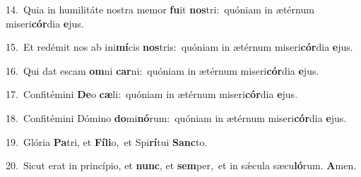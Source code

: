 {\numbfont\textcolor{\numbcolor}{14.}}~Quia in humilitáte nostra memor \textbf{fu}\-it \textbf{nos}\-tri:~\star quóniam in ætérnum miseri\-\textbf{cór}\-dia \textbf{e}\-jus.\par
{\numbfont\textcolor{\numbcolor}{15.}}~Et redémit nos ab ini\-\textbf{mí}\-cis \textbf{nos}\-tris:~\star quóniam in ætérnum miseri\-\textbf{cór}\-dia \textbf{e}\-jus.\par
{\numbfont\textcolor{\numbcolor}{16.}}~Qui dat escam \textbf{om}\-ni \textbf{car}\-ni:~\star quóniam in ætérnum miseri\-\textbf{cór}\-dia \textbf{e}\-jus.\par
{\numbfont\textcolor{\numbcolor}{17.}}~Confitémini \textbf{De}\-o \textbf{cæ}\-li:~\star quóniam in ætérnum miseri\-\textbf{cór}\-dia \textbf{e}\-jus.\par
{\numbfont\textcolor{\numbcolor}{18.}}~Confitémini Dómino \textbf{do}\-mi\-\textbf{nó}\-rum:~\star quóniam in ætérnum miseri\-\textbf{cór}\-dia \textbf{e}\-jus.\par
{\numbfont\textcolor{\numbcolor}{19.}}~Glória \textbf{Pa}\-tri, et \textbf{Fí}\-\textbf{li}o,~\star et Spi\-\textbf{rí}\-tui \textbf{Sanc}\-to.\par
{\numbfont\textcolor{\numbcolor}{20.}}~Sicut erat in princípio, et \textbf{nunc}\-, et \textbf{sem}\-per,~\star et in sǽcula sæcu\-\textbf{ló}\-rum. \textbf{A}\-men.\par
